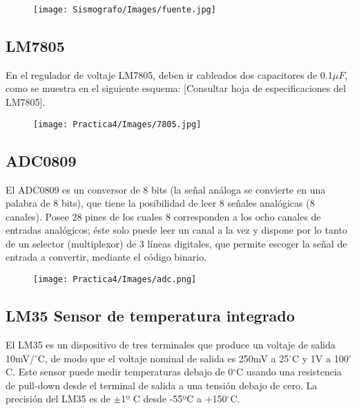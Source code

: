 \documentclass[12pt]{article}
\begin{document}
	        \begin{figure}[h!]
                \centering
                \texttt{[image: Sismografo/Images/fuente.jpg]}
            \end{figure} 
            
        \newpage
        \subsection{LM7805}
        En el regulador de voltaje LM7805, deben ir cableados dos capacitores de $0.1\mu F$, como se muestra en el siguiente esquema: [Consultar hoja de especificaciones del LM7805].
        
        \begin{figure}[h!]
                \centering
                \texttt{[image: Practica4/Images/7805.jpg]}
            \end{figure}
        
        \subsection{ADC0809}
        El ADC0809 es un conversor de 8 bits (la señal análoga se convierte en una palabra de 8 bits), que tiene la posibilidad de leer 8 señales analógicas (8 canales). Posee 28 pines de los cuales 8 corresponden a los ocho canales de entradas analógicos; éste solo puede leer un canal a la vez y dispone por lo tanto de un selector (multiplexor) de 3 líneas digitales, que permite escoger la señal de entrada a convertir, mediante el código binario.
        
        \begin{figure}[h!]
                \centering
                \texttt{[image: Practica4/Images/adc.png]}
            \end{figure}
            \newpage
        \subsection{LM35 Sensor de temperatura integrado}
        El LM35 es un dispositivo de tres terminales que produce un voltaje de salida 10mV/$^{\circ}$C, de modo que el voltaje nominal de salida es 250mV a 25$^{\circ}$C y 1V a 100$^{\circ}$C. Este sensor puede medir temperaturas debajo de 0$^{\circ}$C usando una resistencia de pull-down desde el terminal de salida a una tensión debajo de cero. La precisión del LM35 es de $\pm$1º C desde -55ºC a +150$^{\circ}$C. 
        \begin{center}
            
        
        \end{center}
        
\end{document}

